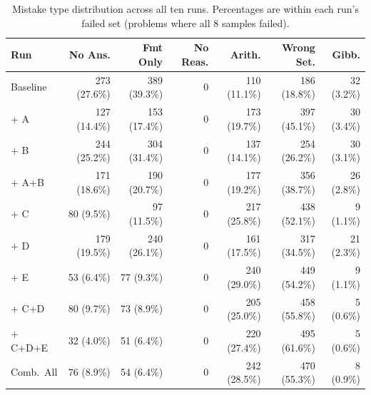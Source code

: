 \begin{table}[H]
\centering
\small
\begin{tabular}{lrrrrrr}
\toprule
\textbf{Run} & \textbf{No Ans.} & \textbf{Fmt Only} & \textbf{No Reas.} & \textbf{Arith.} & \textbf{Wrong Set.} & \textbf{Gibb.} \\
\midrule
Baseline & 273 (27.6\%) & 389 (39.3\%) & 0 & 110 (11.1\%) & 186 (18.8\%) & 32 (3.2\%) \\
\midrule
+ A & 127 (14.4\%) & 153 (17.4\%) & 0 & 173 (19.7\%) & 397 (45.1\%) & 30 (3.4\%) \\
+ B & 244 (25.2\%) & 304 (31.4\%) & 0 & 137 (14.1\%) & 254 (26.2\%) & 30 (3.1\%) \\
+ A+B & 171 (18.6\%) & 190 (20.7\%) & 0 & 177 (19.2\%) & 356 (38.7\%) & 26 (2.8\%) \\
\midrule
+ C & 80 (9.5\%) & 97 (11.5\%) & 0 & 217 (25.8\%) & 438 (52.1\%) & 9 (1.1\%) \\
+ D & 179 (19.5\%) & 240 (26.1\%) & 0 & 161 (17.5\%) & 317 (34.5\%) & 21 (2.3\%) \\
+ E & 53 (6.4\%) & 77 (9.3\%) & 0 & 240 (29.0\%) & 449 (54.2\%) & 9 (1.1\%) \\
+ C+D & 80 (9.7\%) & 73 (8.9\%) & 0 & 205 (25.0\%) & 458 (55.8\%) & 5 (0.6\%) \\
+ C+D+E & 32 (4.0\%) & 51 (6.4\%) & 0 & 220 (27.4\%) & 495 (61.6\%) & 5 (0.6\%) \\
\midrule
Comb.\ All & 76 (8.9\%) & 54 (6.4\%) & 0 & 242 (28.5\%) & 470 (55.3\%) & 8 (0.9\%) \\
\bottomrule
\end{tabular}
\caption{Mistake type distribution across all ten runs. Percentages are within each run's failed set (problems where all 8 samples failed).}
\label{tab:p4-errors-full}
\end{table}